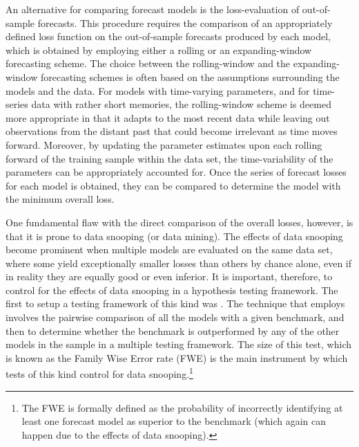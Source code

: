 \documentclass{article} %
\begin{document}
	 An alternative for comparing forecast models is the loss-evaluation of out-of-sample forecasts. This procedure requires the comparison of an appropriately defined loss function on the out-of-sample forecasts produced by each model, which is obtained by employing either a rolling or an expanding-window forecasting scheme. The choice between the rolling-window and the expanding-window forecasting schemes is often based on the assumptions surrounding the models and the data. For models with time-varying parameters, and for time-series data with rather short memories, the rolling-window scheme is deemed more appropriate in that it adapts to the most recent data while leaving out observations from the distant past that could become irrelevant as time moves forward. Moreover, by updating the parameter estimates upon each rolling forward of the training sample within the data set, the time-variability of the parameters can be appropriately accounted for. Once the series of forecast losses for each model is obtained, they can be compared to determine the model with the minimum overall loss.
	 
	 One fundamental flaw with the direct comparison of the overall losses, however, is that it is prone to data snooping (or data mining). The effects of data snooping become prominent when multiple models are evaluated on the same data set, where some yield exceptionally smaller losses than others by chance alone, even if in reality they are equally good or even inferior. It is important, therefore, to control for the effects of data snooping in a hypothesis testing framework. The first to setup a testing framework of this kind was \textcite{WHITE-BRC}. The technique that \textcite{WHITE-BRC} employs involves the pairwise comparison of all the models with a given benchmark, and then to determine whether the benchmark is outperformed by any of the other models in the sample in a multiple testing framework. The size of this test, which is known as the Family Wise Error rate (FWE) is the main instrument by which tests of this kind control for data snooping.\footnote{The FWE is formally defined as the probability of incorrectly identifying at least one forecast model as superior to the benchmark (which again can happen due to the effects of data snooping).}
	 
\end{document}
